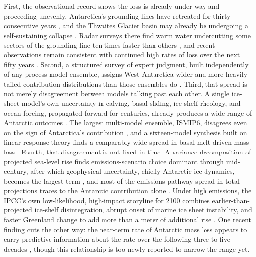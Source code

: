 \documentclass[12pt]{article}
\begin{document}
First, the observational record shows the loss is already under way and
proceeding unevenly. Antarctica's grounding lines have retreated for
thirty consecutive years \citep{Rignot2026}, and the Thwaites Glacier
basin may already be undergoing a self-sustaining collapse
\citep{Joughin2014}. Radar surveys there find warm water undercutting
some sectors of the grounding line ten times faster than others
\citep{Milillo2019}, and recent observations remain consistent with
continued high rates of loss over the next fifty years
\citep{Goldberg2026}. Second, a structured survey of expert judgment,
built independently of any process-model ensemble, assigns West
Antarctica wider and more heavily tailed contribution distributions than
those ensembles do \citep{Bamber2019}. Third, that spread is not merely
disagreement between models talking past each other. A single ice-sheet
model's own uncertainty in calving, basal sliding, ice-shelf rheology,
and ocean forcing, propagated forward for centuries, already produces a
wide range of Antarctic outcomes \citep{Bulthuis2019}. The largest
multi-model ensemble, ISMIP6, disagrees even on the sign of Antarctica's
contribution \citep{Seroussi2020}, and a sixteen-model synthesis built
on linear response theory finds a comparably wide spread in
basal-melt-driven mass loss \citep{Levermann2020}. Fourth, that
disagreement is not fixed in time. A variance decomposition of
projected sea-level rise finds emissions-scenario choice dominant
through mid-century, after which geophysical uncertainty, chiefly
Antarctic ice dynamics, becomes the largest term \citep{Darnell2025},
and most of the emissions-pathway spread in total projections traces to
the Antarctic contribution alone \citep{DeConto2021}. Under high
emissions, the IPCC's own low-likelihood, high-impact storyline for
2100 combines earlier-than-projected ice-shelf disintegration, abrupt
onset of marine ice sheet instability, and faster Greenland change to
add more than a meter of additional rise \citep{Fox-Kemper2021}. One
recent finding cuts the other way: the near-term rate of Antarctic mass
loss appears to carry predictive information about the rate over the
following three to five decades \citep{McCormack2026}, though this
relationship is too newly reported to narrow the range yet.
\end{document}
